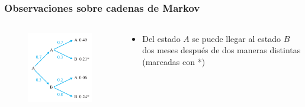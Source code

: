 
\subsection{}

{\nologo
\begin{frame}\frametitle{Observaciones sobre cadenas de Markov}
	
	\begin{columns}[c]
		\begin{column}{0.2\textwidth}			
			\begin{figure}
				\centering
				\includegraphics[width=1.5\textwidth]{imagenes/arbol}
			\end{figure}
			\vspace{1mm}
			
		\end{column}
		\hspace{3mm}
		\begin{column}{0.78\textwidth}
			\begin{itemize}
				\item Del estado $A$ se puede llegar al estado $B$ dos meses después de dos maneras
				distintas (marcadas con *)
				

\end{itemize}
\end{column}
\end{columns}
\end{frame}}
